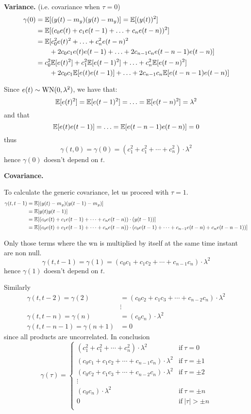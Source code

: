 \textbf{Variance.} (i.e. covariance when $\tau =0$)
\begin{align*}
	\gamma (0)&=\mathbb{E}[(y(t)-m_{y})(y(t)-m_{y})]=\mathbb{E}[(y(t))^2]\\
	&=\mathbb{E}[(c_{0} e(t)+c_{1} e(t-1)+\ldots+c_{n} e(t-n))^{2}]\\
	&=\mathbb{E}[c_{0}^{2} e(t)^{2}+\ldots+c_{n}^{2} e(t-n)^{2}\\
	&\qquad+2 c_{0} c_{1} e(t) e(t-1)+\ldots+2 c_{n-1} c_{n} e(t-n-1) e(t-n)]\\
	&=c_{0}^{2} \mathbb{E}[e(t)^{2}]+c_{1}^{2} \mathbb{E}[e(t-1)^{2}]+\ldots+c_{n}^{2} \mathbb{E}[e(t-n)^{2}]\\
	&\qquad+2 c_{0} c_{1} \mathbb{E}[e(t) e(t-1)]+\ldots+2 c_{n-1} c_{n} \mathbb{E}[e(t-n-1) e(t-n)]
\end{align*}

Since $e(t) \sim \operatorname{WN}(0, \lambda^{2})$, we have that:
$$
\mathbb{E}[e(t)^{2}]=\mathbb{E}[e(t-1)^{2}]=\ldots=\mathbb{E}[e(t-n)^{2}]=\lambda^{2}
$$
and that
$$
\mathbb{E}[e(t) e(t-1)]=\ldots=\mathbb{E}[e(t-n-1) e(t-n)]=0
$$
thus
\[
	\boxed{\gamma (t,0)=\gamma (0)=(c_{1}^2 +c_{1}^2 +\cdots+c_{n}^2 )\cdot\lambda^2}
\]
hence $\gamma (0)$ doesn't depend on $t$.

\textbf{Covariance.}

To calculate the generic covariance, let us proceed with $\tau =1$.
\begin{align*}
	\gamma(t, t-1)&=\mathbb{E}[(y(t)-m_{y})(y(t-1)-m_{y})]\\
	&=\mathbb{E}[y(t) y(t-1)]\\
	&=\mathbb{E}[(c_{0} e(t)+c_{1} e(t-1)+\cdots+c_{n} e(t-n))\cdot (y(t-1))]\\
	&=\mathbb{E}[(c_{0} e(t)+c_{1} e(t-1)+\cdots+c_{n} e(t-n))\cdot (c_{0} e(t-1)+\cdots+c_{n-1} e(t-n)+c_{n} e(t-n-1))]
\end{align*}

Only those terms where the \gls{wn} is multiplied by itself at the same time instant are non null.
\[
	\gamma(t, t-1)=\gamma (1)=(c_{0}c_{1}+c_{1}c_{2}+\cdots+c_{n-1}c_{n})\cdot\lambda^2
\]
hence $\gamma (1)$ doesn't depend on $t$.

Similarly
\begin{align*}
	\gamma (t,t-2)=\gamma (2) &= (c_{0}c_{2}+c_{1}c_{3}+\cdots+c_{n-2}c_{n})\cdot\lambda^2\\
	&\vdots\\
	\gamma (t,t-n)=\gamma (n) &= (c_{0}c_{n})\cdot\lambda^2\\
	\gamma (t,t-n-1)=\gamma (n+1) &= 0
\end{align*}
since all products are uncorrelated. In conclusion
\[
	\gamma (\tau )=\begin{cases}
		(c_{1}^2 +c_{1}^2 +\cdots+c_{n}^2 )\cdot\lambda^2 & \text{if}\ \tau =0\\
		(c_{0}c_{1}+c_{1}c_{2}+\cdots+c_{n-1}c_{n})\cdot\lambda^2 & \text{if}\ \tau =\pm 1\\
		(c_{0}c_{2}+c_{1}c_{3}+\cdots+c_{n-2}c_{n})\cdot\lambda^2 & \text{if}\ \tau =\pm 2\\
		\vdots\\
		(c_{0}c_{n})\cdot\lambda^2 & \text{if}\ \tau =\pm n\\
		0 & \text{if}\ |\tau| > \pm n\\
	\end{cases}
\]
